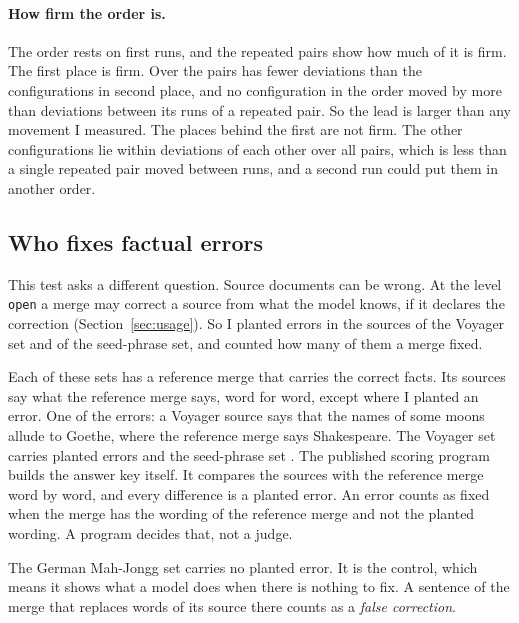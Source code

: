 \paragraph{How firm the order is.} The order rests on first runs, and the repeated pairs show how much of it is firm. The first place is firm. Over the  pairs \texttt{} has  fewer deviations than the configurations in second place, and no configuration in the order moved by more than  deviations between its runs of a repeated pair. So the lead is larger than any movement I measured. The places behind the first are not firm. The other  configurations lie within  deviations of each other over all  pairs, which is less than a single repeated pair moved between runs, and a second run could put them in another order.

\subsection{Who fixes factual errors}
\label{sec:planted}

This test asks a different question. Source documents can be wrong. At the level \texttt{open} a merge may correct a source from what the model knows, if it declares the correction (Section~\ref{sec:usage}). So I planted errors in the sources of the Voyager set and of the seed-phrase set, and counted how many of them a merge fixed.

Each of these sets has a reference merge that carries the correct facts. Its sources say what the reference merge says, word for word, except where I planted an error. One of the errors: a Voyager source says that the names of some moons allude to Goethe, where the reference merge says Shakespeare. The Voyager set carries  planted errors and the seed-phrase set . The published scoring program builds the answer key itself. It compares the sources with the reference merge word by word, and every difference is a planted error. An error counts as fixed when the merge has the wording of the reference merge and not the planted wording. A program decides that, not a judge.

The German Mah-Jongg set carries no planted error. It is the control, which means it shows what a model does when there is nothing to fix. A sentence of the merge that replaces words of its source there counts as a \emph{false correction}.

